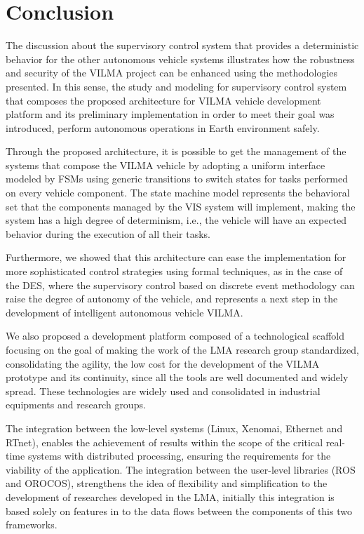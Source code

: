 \documentclass[conference]{IEEEtran}
\begin{document}
\section{Conclusion}\label{sec:conclusion}

The discussion about the supervisory control system that provides a deterministic behavior for the other autonomous vehicle systems illustrates how the robustness and security of the VILMA project can be enhanced using the methodologies presented. In this sense, the study and modeling for supervisory control system that composes the proposed architecture for VILMA vehicle development platform and its preliminary implementation in order to meet their goal was introduced, perform autonomous operations in Earth environment safely.

Through the proposed architecture, it is possible to get the management of the systems that compose the VILMA vehicle by adopting a uniform interface modeled by FSMs using generic transitions to switch states for tasks performed on every vehicle component. The state machine model represents the behavioral set that the components managed by the VIS system will implement, making the system has a high degree of determinism, i.e., the vehicle will have an expected behavior during the execution of all their tasks.

Furthermore, we showed that this architecture can ease the implementation for more sophisticated control strategies using formal techniques, as in the case of the DES, where the supervisory control based on discrete event methodology can raise the degree of autonomy of the vehicle, and represents a next step in the development of intelligent autonomous vehicle VILMA.

We also proposed a development platform composed of a technological scaffold focusing on the goal of making the work of the LMA research group standardized, consolidating the agility, the low cost for the development of the VILMA prototype and its continuity, since all the tools are well documented and widely spread. These technologies are widely used and consolidated in industrial equipments and research groups.

The integration between the low-level systems (Linux, Xenomai, Ethernet and RTnet), enables the achievement of results within the scope of the critical real-time systems with distributed processing, ensuring the requirements for the viability of the application. The integration between the user-level libraries (ROS and OROCOS), strengthens the idea of flexibility and simplification to the development of researches developed in the LMA, initially this integration is based solely on features in to the data flows between the components of this two frameworks.
\end{document}
